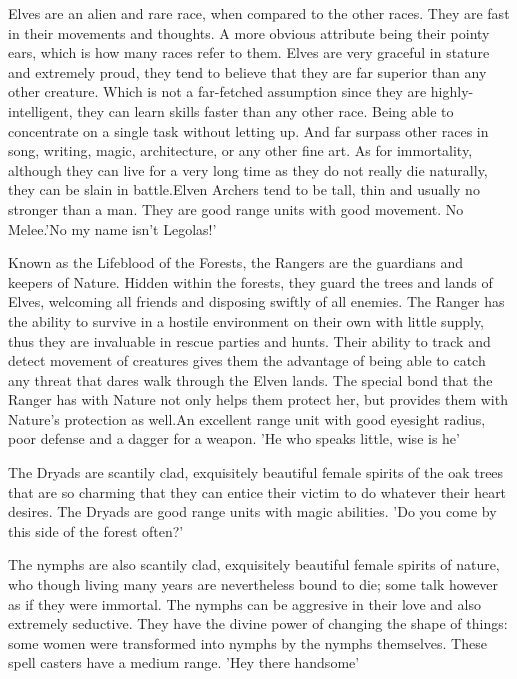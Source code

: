 \documentclass[a4paper]{article}
\begin{document}
Elves are an alien and rare race, when compared to the other races.  They are fast in their movements and thoughts. A more obvious attribute being their pointy ears, which is how many races refer to them. Elves are very graceful in stature and extremely proud, they tend to believe that they are far superior than any other creature. Which is not a far-fetched assumption since they are highly-intelligent, they can learn skills faster than any other race. Being able to concentrate on a single task without letting up. And far surpass other races in song, writing, magic, architecture, or any other fine art. As for immortality, although they can live for a very long time as they do not really die naturally, they can be slain in battle.Elven Archers tend to be tall, thin and usually no stronger than a man. They are good range units with good movement. No Melee.'No my name isn't Legolas!'

Known as the Lifeblood of the Forests, the Rangers are the guardians and keepers of Nature. Hidden within the forests, they guard the trees and lands of Elves, welcoming all friends and disposing swiftly of all enemies. The Ranger has the ability to survive in a hostile environment on their own with little supply, thus they are invaluable in rescue parties and hunts. Their ability to track and detect movement of creatures gives them the advantage of being able to catch any threat that dares walk through the Elven lands. The special bond that the Ranger has with Nature not only helps them protect her, but provides them with Nature's protection as well.An excellent range unit with good eyesight radius, poor defense and a dagger for a weapon. 'He who speaks little, wise is he'

The Dryads are scantily clad, exquisitely beautiful female spirits of the oak trees that are so charming that they can entice their victim to do whatever their heart desires. The Dryads are good range units with magic abilities. 'Do you come by this side of the forest often?'

The nymphs are also scantily clad, exquisitely beautiful female spirits of nature, who though living many years are nevertheless bound to die; some talk however as if they were immortal. The nymphs can be aggresive in their love and also extremely seductive. They have the divine power of changing the shape of things: some women were transformed into nymphs by the nymphs themselves. These spell casters have a medium range. 'Hey there handsome'
\end{document}
